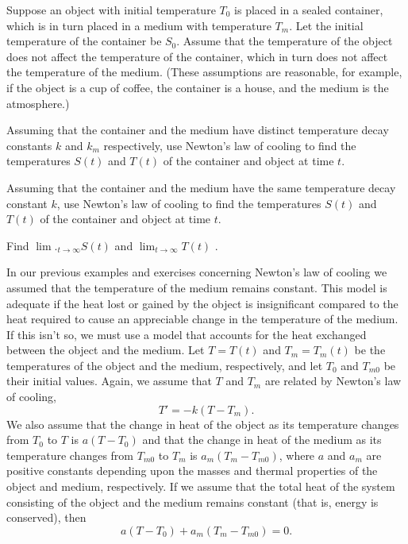 \begin{exerciselist}
\item\label{exer:4.2.16}Suppose an object  with initial temperature $T_0$
is placed in a sealed container, which is in turn placed in a medium with
temperature $T_m$. Let the initial
temperature of the container be $S_0$. Assume that the temperature of the
object does not affect the temperature of the container, which in turn does
not affect the temperature of the medium. (These assumptions  are
reasonable, for example, if the object is a cup of coffee, the container is
a house, and the medium is the atmosphere.)

\begin{alist}
\item %
Assuming that the container and the medium have distinct temperature
decay constants $k$ and $k_m$ respectively, use Newton's law of
cooling to find the temperatures $S(t)$ and $T(t)$ of the container
and object at time $t$.

\item %
Assuming that the container and the medium have the same temperature
decay constant $k$, use Newton's law of cooling to find the
temperatures $S(t)$ and $T(t)$ of the container and object at time
$t$.

\item %
Find $\lim._{t\to\infty}S(t)$  and $\lim_{t\to\infty}T(t)$ .
\end{alist}


\item\label{exer:4.2.17}%
{}
In  our previous examples and exercises concerning Newton's law of cooling
we assumed that
the temperature of the medium remains constant.  This model is adequate
if the heat lost or gained by the object is
insignificant compared to the heat required to cause an appreciable change
in the temperature of the medium. If this isn't  so,  we
must use a model that accounts for the heat exchanged between the object
and the medium. Let $T=T(t)$ and $T_m=T_m(t)$  be the temperatures of the
object and the medium, respectively, and let $T_0$  and $T_{m0}$ be
their
initial values.  Again, we assume that $T$  and $T_m$ are related by
Newton's law of cooling,
\[
T'=-k(T-T_m).\tag{A}
\]
We also assume that the change in heat of the object as its
temperature changes from $T_0$ to $T$  is $a(T-T_0)$
and that the change in heat of the medium  as its
temperature changes from $T_{m0}$ to $T_m$  is $a_m(T_m-T_{m0})$,
where $a$
and $a_m$ are positive constants  depending  upon the masses and
thermal properties of the
object and medium, respectively.  If we assume that the total heat of
the system consisting of the object and the medium remains constant
(that is, energy is conserved), then
\[
a(T-T_0)+a_m(T_m-T_{m0})=0.\tag{B}
\]


\end{exerciselist}
